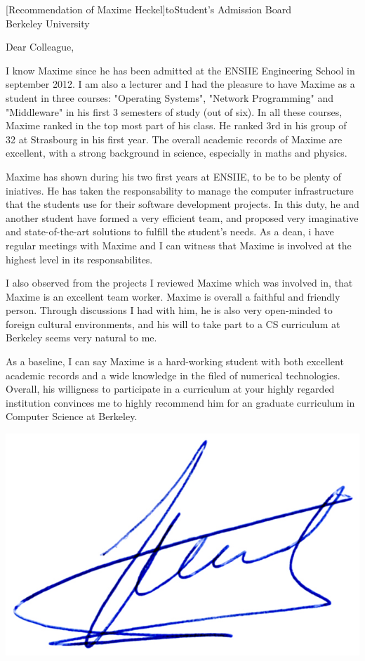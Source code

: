 \documentclass[a4paper,10pt]{article}
\begin{document}

\begin{letter}[Recommendation of Maxime Heckel]{to}{Student's Admission Board\\%
Berkeley University}

Dear Colleague, 

I know  Maxime since he  has been admitted at  the ENSIIE Engineering  School in
september 2012.  I am also a lecturer and  I had the pleasure to have Maxime as a
student  in  three  courses:  "Operating  Systems",  "Network  Programming"  and
"Middleware"  in his  first 3  semesters of  study (out  of six).  In all  these
courses, Maxime ranked in the top most  part of his class. He ranked 3rd in his
group of 32 at Strasbourg in his first year. The overall academic records of Maxime 
are excellent, with a strong background in science, especially in maths and physics. 


Maxime has  shown during his two  first years at ENSIIE,  to be to be  plenty of
iniatives.    He  has   taken  the   responsability  to   manage  the   computer
infrastructure that the students use for their software development projects. In
this  duty, he  and  another student  have  formed a  very  efficient team,  and
proposed  very  imaginative  and   state-of-the-art  solutions  to  fulfill  the
student's needs.   As a  dean, i  have regular  meetings with  Maxime and  I can
witness that Maxime is involved at the highest level in its responsabilites.

I also observed from the projects I  reviewed Maxime which was involved in, that
Maxime is an  excellent team worker.  Maxime is overall  a faithful and friendly
person.  Through  discussions I  had with  him, he is  also very  open-minded to
foreign cultural environments, and  his will to take part to  a CS curriculum at
Berkeley seems very natural to me.

As a baseline,  I can say Maxime  is a hard-working student  with both excellent
academic records  and a wide knowledge  in the filed of  numerical technologies.
Overall, his willigness  to participate in a curriculum at  your highly regarded
institution convinces me  to highly recommend him for an  graduate curriculum in
Computer Science at Berkeley.

\end{letter}
\begin{flushright}
\includegraphics[width=.26\textwidth]{signgenaud.jpg}
\end{flushright}
%
\end{document}
